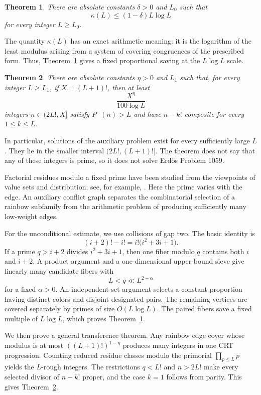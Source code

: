 \documentclass[11pt]{amsart}
\newtheorem{theorem}{Theorem}[section]
\theoremstyle{definition}
\theoremstyle{remark}
\begin{document}
\begin{theorem}\label{thm:covercost}
There are absolute constants $\delta>0$ and $L_0$ such that
\[
\kappa(L)\leq(1-\delta)L\log L
\]
for every integer $L\geq L_0$.
\end{theorem}

The quantity $\kappa(L)$ has an exact arithmetic meaning: it is the
logarithm of the least modulus arising from a system of covering
congruences of the prescribed form.  Thus, Theorem~\ref{thm:covercost}
gives a fixed proportional saving at the $L\log L$ scale.

\begin{theorem}\label{thm:main}
There are absolute constants $\eta>0$ and $L_1$ such that, for every integer
$L\geq L_1$, if $X=(L+1)!$, then at least
\[
\frac{X^\eta}{100\log L}
\]
integers $n\in(2L!,X]$ satisfy $P^-(n)>L$ and have $n-k!$ composite for
every $1\leq k\leq L$.
\end{theorem}

In particular, solutions of the auxiliary problem exist for every
sufficiently large $L$.  They lie in the smaller interval
$(2L!,(L+1)!]$.  The theorem does not say that any of these integers is
prime, so it does not solve Erd\H{o}s Problem 1059.

Factorial residues modulo a fixed prime have been studied from the viewpoints
of value sets and distribution; see, for example,
\cite{BanksLucaShparlinskiStichtenoth,GaraevLucaShparlinski,
KlurmanMunsch,Hu}.  Here the prime varies with the edge.  An auxiliary
conflict graph separates the combinatorial selection of a rainbow subfamily
from the arithmetic problem of producing sufficiently many low-weight
edges.

For the unconditional estimate, we use collisions of gap two.  The basic
identity is
\begin{equation}\label{eq:keyidentity}
(i+2)!-i!=i!\bigl(i^2+3i+1\bigr).
\end{equation}
If a prime $q>i+2$ divides $i^2+3i+1$, then one fiber modulo $q$ contains
both $i$ and $i+2$.  A product argument and a one-dimensional upper-bound
sieve give linearly many candidate fibers with
\[
L<q\ll L^{2-\alpha}
\]
for a fixed $\alpha>0$.  An independent-set argument selects a constant
proportion having distinct colors and disjoint designated pairs.  The
remaining vertices are covered separately by primes of size $O(L\log L)$.
The paired fibers save a fixed multiple of $L\log L$, which proves
Theorem~\ref{thm:covercost}.

We then prove a general transference theorem.  Any rainbow edge cover whose
modulus is at most $((L+1)!)^{1-\eta}$ produces many integers in one CRT
progression.  Counting reduced residue classes modulo the primorial
$\prod_{p\leq L}p$ yields the $L$-rough integers.  The restrictions
$q<L!$ and $n>2L!$ make every selected divisor of $n-k!$ proper, and the
case $k=1$ follows from parity.  This gives Theorem~\ref{thm:main}.
\end{document}
